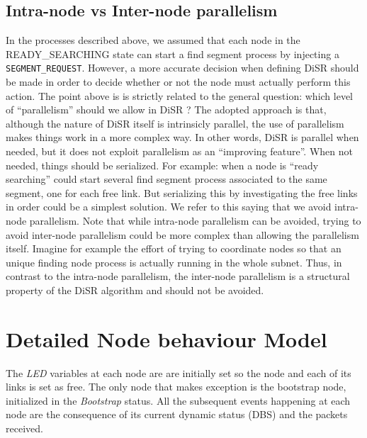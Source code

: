 \subsection{Intra-node vs Inter-node parallelism}
In the processes described above, we assumed that each node in the
READY\_SEARCHING state can start a find segment process by injecting a
\texttt{SEGMENT\_REQUEST}. However, a more accurate decision when defining DiSR
should be made in order to decide whether or not the node must
actually perform this action. 
The point above is is strictly related to the general question: which
level of “parallelism” should we allow in DiSR ? The adopted approach
is that, although the nature of DiSR itself is intrinsicly parallel,
the use of parallelism makes things work in a more complex way. In
other words, DiSR is parallel when needed, but it does not exploit
parallelism as an “improving feature”. When not needed, things should
be serialized. For example: when a node is “ready searching” could
start several find segment process associated to the same segment, one
for each free link. But serializing this by investigating the free
links in order could be a simplest solution. We refer to this saying
that we avoid intra-node parallelism.  Note that while intra-node
parallelism can be avoided, trying to avoid inter-node parallelism
could be more complex than allowing the parallelism itself. Imagine
for example the effort of trying to coordinate nodes so that an unique
finding node process is actually running in the whole subnet. Thus, in
contrast to the intra-node parallelism, the inter-node parallelism is
a structural property of the DiSR algorithm and should not be avoided.



\section{Detailed Node behaviour Model}
\label{sec:execution_model}

The \emph{LED} variables at each node are are initially set so the node and
each of its links is set as free. The only node that makes exception
is the bootstrap node, initialized in the \emph{Bootstrap} status. All
the subsequent events happening at each node are the consequence of
its current dynamic status (DBS) and the packets received.



